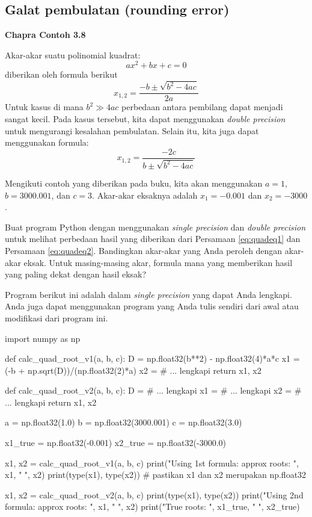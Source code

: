 \subsection{Galat pembulatan (rounding error)}

\textbf{Chapra Contoh 3.8}

Akar-akar suatu polinomial kuadrat:
\begin{equation*}
ax^2 + bx + c = 0
\end{equation*}
diberikan oleh formula berikut
\begin{equation}
x_{1,2} = \frac{-b \pm \sqrt{b^2 - 4ac}}{2a}
\label{eq:quadeq1}
\end{equation}
Untuk kasus di mana $b^2 \gg 4ac$ perbedaan antara pembilang dapat menjadi sangat kecil.
Pada kasus tersebut, kita dapat menggunakan \textit{double precision} untuk mengurangi
kesalahan pembulatan. Selain itu, kita juga dapat menggunakan formula:
\begin{equation}
x_{1,2} = \frac{-2c}{b \pm \sqrt{b^2 - 4ac}}
\label{eq:quadeq2}
\end{equation}

Mengikuti contoh yang diberikan pada buku, kita akan menggunakan
$a = 1$, $b = 3000.001$, dan $c = 3$. Akar-akar eksaknya adalah
$x_{1} = -0.001$ dan $x_2 = -3000$.

\begin{soal}
Buat program Python dengan menggunakan \textit{single precision} dan
\textit{double precision} untuk melihat perbedaan hasil yang diberikan 
dari Persamaan \eqref{eq:quadeq1} dan Persamaan \eqref{eq:quadeq2}.
Bandingkan akar-akar yang Anda peroleh dengan akar-akar eksak.
Untuk masing-masing akar, formula mana yang memberikan hasil yang paling dekat dengan
hasil eksak?
\end{soal}

Program berikut ini adalah dalam \textit{single precision}
yang dapat Anda lengkapi. Anda juga dapat menggunakan program yang Anda tulis sendiri
dari awal atau modifikasi dari program ini.
\begin{pythoncode}
import numpy as np

def calc_quad_root_v1(a, b, c):
    D = np.float32(b**2) - np.float32(4)*a*c
    x1 = (-b + np.sqrt(D))/(np.float32(2)*a)
    x2 = # ... lengkapi
    return x1, x2
  
def calc_quad_root_v2(a, b, c):
    D = # ... lengkapi
    x1 = # ... lengkapi
    x2 = # ... lengkapi
    return x1, x2
  
a = np.float32(1.0)
b = np.float32(3000.001)
c = np.float32(3.0)
  
x1_true = np.float32(-0.001)
x2_true = np.float32(-3000.0)
  
x1, x2 = calc_quad_root_v1(a, b, c)
print("Using 1st formula: approx roots: ", x1, " ", x2)
print(type(x1), type(x2)) # pastikan x1 dan x2 merupakan np.float32
  
x1, x2 = calc_quad_root_v2(a, b, c)
print(type(x1), type(x2))
print("Using 2nd formula: approx roots: ", x1, " ", x2)  
print("True roots: ", x1_true, " ", x2_true)
\end{pythoncode}


